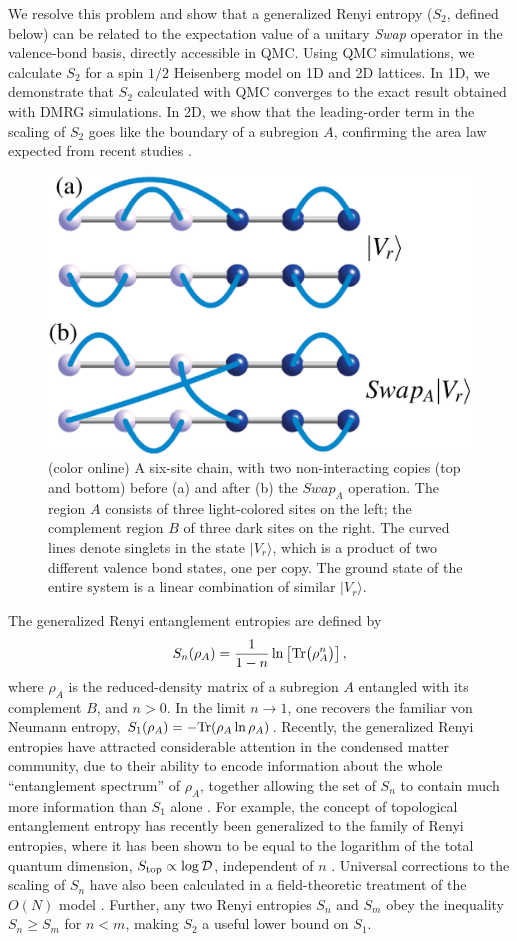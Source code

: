 \documentclass[prl,aps,twocolumn,floatfix,amsmath,amssymb,superscriptaddress,tightenlines]{revtex4}
\begin{document}
We resolve this problem and show that a generalized Renyi entropy ($S_2$, defined below) can be related to the expectation
value of a unitary {\it Swap} operator in the valence-bond basis,
directly accessible in QMC.
Using QMC simulations, we calculate $S_2$ for a spin $1/2$ Heisenberg model
on 1D and 2D lattices.  In 1D, we demonstrate that $S_2$ calculated with QMC converges to the exact result obtained with DMRG simulations.  In 2D, we show that the leading-order term in the scaling of $S_2$ goes like the boundary of a subregion $A$, 
confirming the area law expected from recent studies \cite{Ann}.

\begin{figure} {
\includegraphics[width=2.4 in]{swap_2.eps} \caption{(color online) 
\label{swap_2}
A six-site chain, with two non-interacting copies (top and bottom) before
(a) and after (b) the $Swap_A$ operation. %
The region $A$ consists of three light-colored sites on the left; the
complement region $B$ of three dark sites on the right.  The curved lines denote
singlets in the state $|V_{r}\rangle$, which is a product of two
different valence bond states, one per copy.
The ground state of the entire system is a linear combination of similar $|V_{r}\rangle$.
}
} \end{figure}

The generalized Renyi entanglement entropies are defined by
\begin{equation}
S_{n} (\rho_A) = \frac{1}{1- n} \ln \left[{ {\rm Tr}\big( \rho_A^{n} \big) }\right],
\label{Sn}
\end{equation}
where $\rho_A$ is the reduced-density matrix of a subregion $A$ entangled with its complement $B$, and 
$n>0$.  In the limit $n \rightarrow 1$, one recovers the 
familiar von Neumann entropy, $S_1 (\rho_A) = - {\rm Tr}( \rho_A \ln \rho_A )$.  
Recently, the generalized Renyi entropies have attracted considerable attention in the condensed matter community, due to their ability to encode
information about the whole ``entanglement spectrum'' of $\rho_A$, together allowing the set of $S_{n}$ to contain 
much more information than $S_1$ alone \cite{Espec}.  For example, the concept of topological entanglement entropy has recently been
generalized to the family of Renyi entropies, where it has been shown to be equal to the logarithm of the total quantum 
dimension, $S_{\rm top} \propto \log {\mathcal D}$, independent of $n$ \cite{PI}.  Universal corrections to the scaling of $S_{n}$ 
have also been calculated in a field-theoretic treatment of the $O(N)$ model \cite{Max}.
Further, any two Renyi entropies $S_{n}$ and $S_{m}$ obey the
inequality $S_{n} \geq S_{m}$ for $n < m$, making $S_2$ a
useful lower bound on $S_1$.  
\end{document}
